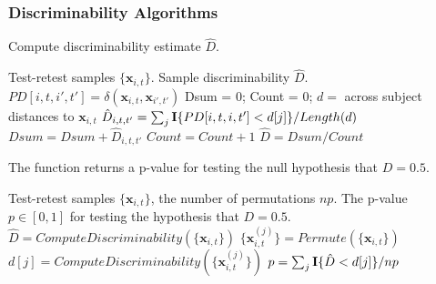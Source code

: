 \documentclass[simplex.tex]{subfiles}
\providecommand{\mb}[1]{\boldsymbol{#1}}
\newcommand{\bx}{\mb{x}}
\begin{document}
\subsubsection*{Discriminability Algorithms}
\begin{algorithm}               
	\caption{Compute discriminability estimate $\hat{D}$.  }   
	\label{alg:dhat}                       
	\begin{algorithmic}                    
		\Require Test-retest samples $\{\bx_{i,t}\}$.
		\Ensure Sample discriminability $\hat{D}$. 
		 
		\State $PD[i,t,i',t'] = \delta(\bx_{i,t},\bx_{i',t'})$
		\EndFor
		\State Dsum = 0;
		\State Count = 0;
		\State $d =$ across subject distances to $\bx_{i,t}$
		\State $\hat{D}_{i,t,t'} =\sum_j {\bf I}\{PD[i,t,i,t'] < d[j]\}/Length(d)$ 
		\State $Dsum = Dsum + \hat{D}_{i,t,t'}$
		\State $Count = Count + 1$
		\EndFor	
		\EndFor
		\EndFor
		\State $\hat{D} = Dsum / Count$ 
		\EndFunction
	\end{algorithmic}
\end{algorithm}

\begin{algorithm}               
	\caption{The function returns a p-value for testing the null hypothesis that $D = 0.5$.  }   
	\label{alg:ost}                       
	\begin{algorithmic}                    
		\Require Test-retest samples $\{\bx_{i,t}\}$, the number of permutations $np$.
		\Ensure The p-value $p \in [0,1]$ for testing the hypothesis that $D = 0.5$. 
		\State $\hat{D}= ComputeDiscriminability(\{\bx_{i,t}\})$ 
		\State $\{\bx^{(j)}_{i,t}\} = Permute(\{\bx_{i,t}\})$ 
		\State $d[j] = ComputeDiscriminability(\{\bx^{(j)}_{i,t}\})$ 
		\EndFor
		\State $p = \sum_j {\bf I}\{\hat{D} < d[j]\} / np$ 
		\EndFunction
	\end{algorithmic}
\end{algorithm}
\end{document}

